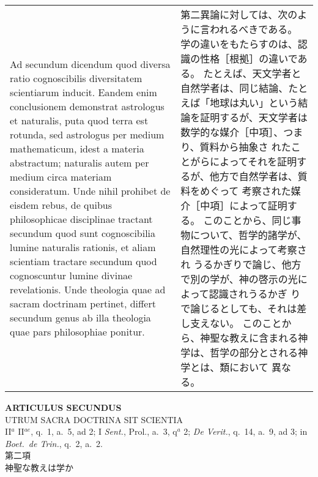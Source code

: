 \documentclass[10pt]{jsarticle} %
\begin{document}
\begin{longtable}{p{21em}p{21em}}
\\



Ad secundum dicendum quod diversa ratio
cognoscibilis diversitatem scientiarum inducit. Eandem enim conclusionem
demonstrat astrologus et naturalis, puta quod terra est rotunda, sed
astrologus per medium mathematicum, idest a materia abstractum;
naturalis autem per medium circa materiam consideratum. Unde nihil
prohibet de eisdem rebus, de quibus philosophicae disciplinae tractant
secundum quod sunt cognoscibilia lumine naturalis rationis, et aliam
scientiam tractare secundum quod cognoscuntur lumine divinae
revelationis. Unde theologia quae ad sacram doctrinam pertinet, differt
secundum genus ab illa theologia quae pars philosophiae ponitur.


&

第二異論に対しては、次のように言われるべきである。
学の違いをもたらすのは、認識の性格［根拠］の違いである。
たとえば、天文学者と自然学者は、同じ結論、たとえば「地球は丸い」という結
 論を証明するが、天文学者は数学的な媒介［中項］、つまり、質料から抽象さ
 れたことがらによってそれを証明するが、他方で自然学者は、質料をめぐって
 考察された媒介［中項］によって証明する。
このことから、同じ事物について、哲学的諸学が、自然理性の光によって考察され
 うるかぎりで論じ、他方で別の学が、神の啓示の光によって認識されうるかぎ
 りで論じるとしても、それは差し支えない。
このことから、神聖な教えに含まれる神学は、哲学の部分とされる神学とは、類において
 異なる。


\end{longtable}

\newpage


\begin{center}
 {\Large {\bf ARTICULUS SECUNDUS}}\\
 {\large UTRUM SACRA DOCTRINA SIT SCIENTIA}\\
 {\footnotesize II$^a$ II$^{ae}$, q.~1, a.~5, ad 2; I {\itshape Sent.},
 Prol., a.~3, q$^a$ 2; {\itshape De Verit.}, q.~14, a.~9, ad 3; in
 {\itshape Boet.~de Trin.}, q.~2, a.~2.}\\
 {\Large 第二項\\神聖な教えは学か}
\end{center}
\end{document}
